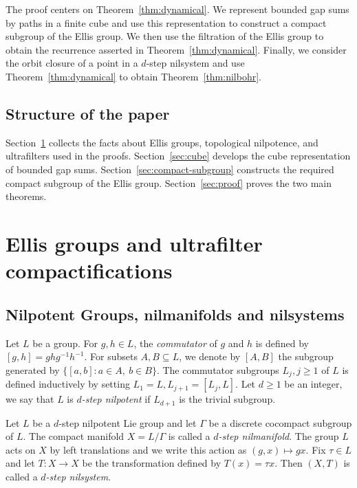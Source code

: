\documentclass[11pt]{amsart}
\theoremstyle{definition}
\theoremstyle{remark}
\begin{document}
The proof centers on Theorem~\ref{thm:dynamical}.  We represent bounded gap sums by paths in a finite cube and use this representation to construct a compact subgroup of the Ellis group.  
We then use the filtration of the
Ellis group to obtain the recurrence asserted in
Theorem~\ref{thm:dynamical}.  Finally, we consider the orbit closure of a point in a $d$-step nilsystem
and use Theorem~\ref{thm:dynamical} to obtain
Theorem~\ref{thm:nilbohr}.

 

\subsection{Structure of the paper}\label{sec:intro-structure}

Section~\ref{sec:prelim} collects the facts about Ellis groups, topological
nilpotence, and ultrafilters used in the proofs.  Section~\ref{sec:cube}
develops the cube representation of bounded gap sums.
Section~\ref{sec:compact-subgroup} constructs the required compact subgroup of
the Ellis group.  Section~\ref{sec:proof} proves the two main theorems.  

\section{Ellis groups and ultrafilter compactifications}\label{sec:prelim}


\subsection{Nilpotent Groups, nilmanifolds and nilsystems}

Let $L$ be a group. For $g, h \in L$, the \emph{commutator} of $g$ and $h$ is defined by $ [g, h] = g h g^{-1} h^{-1}$.
For subsets $A, B \subseteq L$, we denote by $[A, B]$ the subgroup generated by $\{ [a, b] : a \in A,\ b \in B \}$. The commutator subgroups $ L_j, j \geq 1$ of $L$ is defined inductively by setting $ L_1 = L,  L_{j+1} = [L_j, L]$.
Let  $d \geq 1$ be an integer, we say that $L$ is \emph{$d$-step nilpotent} if $L_{d+1}$ is the trivial subgroup.

Let $L$ be a $d$-step nilpotent Lie group and let $\Gamma$ be a discrete cocompact subgroup of $L$. The compact manifold $X = L / \Gamma$ is called a \emph{$d$-step nilmanifold}. The group $L$ acts on $X$  by left translations and we write this action as $(g, x) \mapsto g x$. Fix $\tau \in L$ and let $T \colon X \to X$ be the transformation defined by $T(x) = \tau x$. Then $(X, T)$ is called a \emph{$d$-step nilsystem}.
\end{document}
